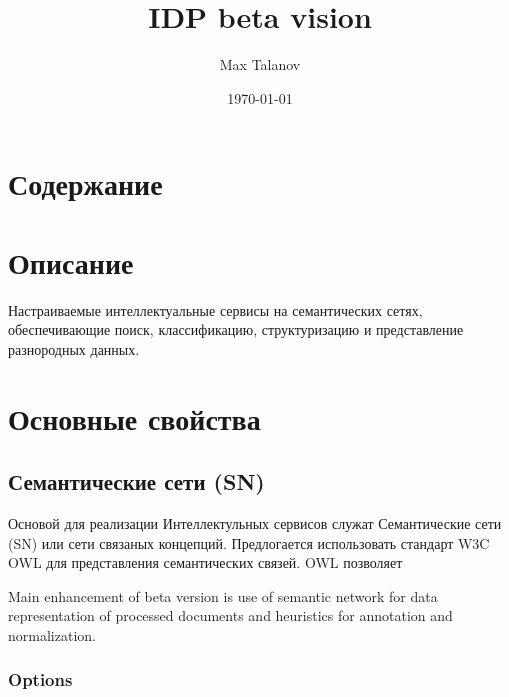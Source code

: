 \documentclass[12pt]{article}
\title{IDP beta vision}
\author{Max Talanov}
\date{\today}
\begin{document}
\maketitle

\section{Содержание}
\tableofcontents

\section{Описание}

Настраиваемые интеллектуальные сервисы на семантических сетях, 
обеспечивающие поиск, классификацию, структуризацию и представление разнородных данных.\\


\section{Основные свойства}

\subsection{Семантические сети (SN)}
Основой для реализации Интеллектульных сервисов служат Семантические сети (SN) или сети связаных концепций. 
Предлогается использовать стандарт W3C OWL для представления семантических связей. OWL позволяет 

Main enhancement of beta version is use of semantic network for data representation of processed documents and heuristics for annotation and normalization.

\subsubsection{Options}
\end{document}
